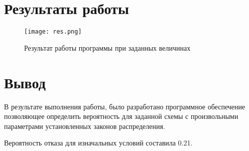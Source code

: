 \section*{Результаты работы}

\begin{figure}[h]
    \centering
    \texttt{[image: res.png]}
    \caption{Результат работы программы при заданных величинах}
\end{figure}



\clearpage

\section*{Вывод}

В результате выполнения работы, было разработано программное обеспечение
позволяющее определить вероятность для заданной схемы с произвольными
параметрами установленных законов распределения.

Вероятность отказа для изначальных условий составила 0.21.


